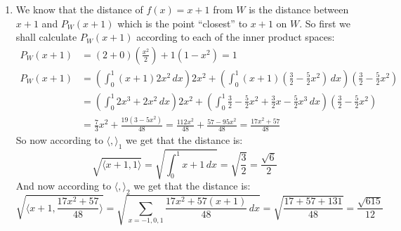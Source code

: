 \documentclass[11pt, a4paper]{article}
\begin{document}
\begin{solution}
\begin{enumerate}
  \item[(3)]
  We know that the distance of $f(x)=x+1$ from $W$ is the distance between
  $x+1$ and $P_W(x+1)$ which is the point ``closest'' to $x+1$ on $W$. So
  first we shall calculate $P_W(x+1)$ according to each of the inner product
  spaces:
  \begin{align*}
    P_W(x+1) &= \left(2+0\right)\left(\frac{x^2}{2}\right) + 1
    \left(1-x^2\right) = 1 \\
    P_W(x+1) &= \left(\int_{0}^{1}{(x+1)2x^2\,dx}\right) 2x^2 + 
    \left(\int_{0}^{1}{(x+1)\left(\frac{3}{2} - \frac{5}{2}x^2\right)\,dx}
    \right) \left(\frac{3}{2}-\frac{5}{2}x^2\right) \\ &=
    \left(\int_{0}^{1}{2x^3+2x^2\,dx}\right) 2x^2 +
    \left(\int_{0}^{1}{\frac{3}{2} - \frac{5}{2}x^2 + \frac{3}{2}x - 
    \frac{5}{2}x^3\,dx}\right) \left(\frac{3}{2}-\frac{5}{2}x^2\right) \\ &=
    \frac{7}{3}x^2 + \frac{19(3-5x^2)}{48} =
    \frac{112x^2}{48} + \frac{57 - 95x^2}{48} = \frac{17x^2+57}{48}
  \end{align*}
  So now according to $\langle ,\rangle_1$ we get that the distance is:
  \[
    \sqrt{\langle x+1,1\rangle} = \sqrt{\int_{0}^{1}{x+1\,dx}} = 
    \sqrt{\frac{3}{2}} = \frac{\sqrt{6}}{2}
  \]
  And now according to $\langle ,\rangle_2$ we get that the distance is:
  \[
    \sqrt{\langle x+1, \frac{17x^2+57}{48}\rangle} = 
    \sqrt{\sum_{x=-1,0,1}{\frac{17x^2+57(x+1)}{48}\,dx}} = 
    \sqrt{\frac{17+57+131}{48}} = 
    \frac{\sqrt{615}}{12}
  \]
\end{enumerate}
\end{solution}
\end{document}
